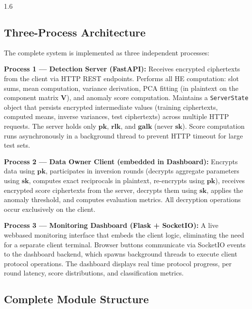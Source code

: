 \begin{spacing}{1.6}
\subsection{Three-Process Architecture}

The complete system is implemented as three independent processes:

\textbf{Process 1 --- Detection Server (FastAPI):}
Receives encrypted ciphertexts from the client via HTTP REST endpoints. Performs
all HE computation: slot sums, mean computation, variance derivation, PCA
fitting (in plaintext on the component matrix $\mathbf{V}$), and anomaly score
computation. Maintains a \texttt{ServerState} object that persists encrypted
intermediate values (training ciphertexts, computed means, inverse variances,
test ciphertexts) across multiple HTTP requests. The server holds only
$\mathbf{pk}$, $\mathbf{rlk}$, and $\mathbf{galk}$ (never $\mathbf{sk}$).
Score computation runs asynchronously in a background thread to prevent HTTP
timeout for large test sets.

\textbf{Process 2 --- Data Owner Client (embedded in Dashboard):}
Encrypts data using $\mathbf{pk}$, participates in inversion rounds (decrypts
aggregate parameters using $\mathbf{sk}$, computes exact reciprocals in
plaintext, re-encrypts using $\mathbf{pk}$), receives encrypted score
ciphertexts from the server, decrypts them using $\mathbf{sk}$, applies the
anomaly threshold, and computes evaluation metrics. All decryption operations
occur exclusively on the client.

\textbf{Process 3 --- Monitoring Dashboard (Flask + SocketIO):}
A live webbased monitoring interface that embeds the client logic, eliminating
the need for a separate client terminal. Browser buttons communicate via
SocketIO events to the dashboard backend, which spawns background threads to
execute client protocol operations. The dashboard displays real time protocol
progress, per round latency, score distributions, and classification metrics.

\subsection{Complete Module Structure}

\end{spacing}

